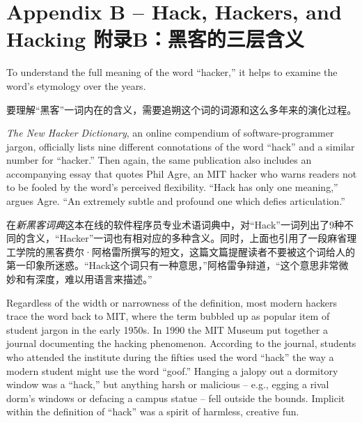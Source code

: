 

\chapter{\ifdefined\eng
Appendix B -- Hack, Hackers, and Hacking
\fi
\ifdefined\chs
附录B：黑客的三层含义
\fi} \label{Appendix B}

\ifdefined\eng
To understand the full meaning of the word ``hacker,'' it helps to examine the word's etymology over the years.
\fi

\ifdefined\chs
要理解“黑客”一词内在的含义，需要追朔这个词的词源和这么多年来的演化过程。
\fi

\ifdefined\eng
\textit{The New Hacker Dictionary}, an online compendium of software-programmer jargon, officially lists nine different connotations of the word ``hack'' and a similar number for ``hacker.'' Then again, the same publication also includes an accompanying essay that quotes Phil Agre, an MIT hacker who warns readers not to be fooled by the word's perceived flexibility. ``Hack has only one meaning,'' argues Agre. ``An extremely subtle and profound one which defies articulation.''  %
\fi

\ifdefined\chs
在\textit{新黑客词典}这本在线的软件程序员专业术语词典中，对“Hack”一词列出了9种不同的含义，“Hacker”一词也有相对应的多种含义。同时，上面也引用了一段麻省理工学院的黑客费尔·阿格雷所撰写的短文，这篇文篇提醒读者不要被这个词给人的第一印象所迷惑。“Hack这个词只有一种意思，”阿格雷争辩道，“这个意思非常微妙和有深度，难以用语言来描述。” %
\fi

\ifdefined\eng
Regardless of the width or narrowness of the definition, most modern hackers trace the word back to MIT, where the term bubbled up as popular item of student jargon in the early 1950s. In 1990 the MIT Museum put together a journal documenting the hacking phenomenon. According to the journal, students who attended the institute during the fifties used the word ``hack'' the way a modern student might use the word ``goof.'' Hanging a jalopy out a dormitory window was a ``hack,'' but anything harsh or malicious -- e.g., egging a rival dorm's windows or defacing a campus statue -- fell outside the bounds. Implicit within the definition of ``hack'' was a spirit of harmless, creative fun.
\fi

